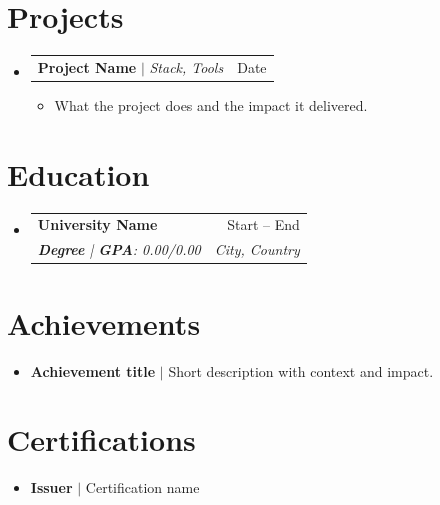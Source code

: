 \documentclass[letterpaper,11pt]{article}
\makeatletter
\newcommand{\resumeItem}[1]{
  \item\small{
    {#1 \vspace{-2pt}}
  }
}
\newcommand{\resumeSubheading}[4]{
  \vspace{-2pt}\item
  \begin{tabular*}{0.97\textwidth}[t]{l@{\extracolsep{\fill}}r}
    \textbf{\color{darkblue}#1} & #2 \\
    \textit{\small#3} & \textit{\small #4} \\
  \end{tabular*}\vspace{-7pt}
}
\newcommand{\resumeProjectHeading}[2]{
    \item
    \begin{tabular*}{0.97\textwidth}{l@{\extracolsep{\fill}}r}
      \small\color{darkblue}#1 & #2 \\
    \end{tabular*}\vspace{-7pt}
}
\newcommand{\resumeSubHeadingListStart}{\begin{itemize}[leftmargin=0.15in, label={}]}
\newcommand{\resumeSubHeadingListEnd}{\end{itemize}}
\newcommand{\resumeItemListStart}{\begin{itemize}}
\newcommand{\resumeItemListEnd}{\end{itemize}\vspace{-5pt}}
\makeatother
\begin{document}
\section{Projects}
  \resumeSubHeadingListStart
    \resumeProjectHeading
      {\textbf{\color{darkblue}Project Name} $|$ \emph{Stack, Tools}}
      {Date}
      \resumeItemListStart
        \resumeItem{What the project does and the impact it delivered.}
      \resumeItemListEnd
  \resumeSubHeadingListEnd

\section{Education}
  \resumeSubHeadingListStart
    \resumeSubheading
      {University Name}{Start -- End}
      {\textbf{Degree} | \textbf{\color{darkblue}GPA}: 0.00/0.00}{City, Country}
  \resumeSubHeadingListEnd

\section{Achievements}
  \resumeSubHeadingListStart
      \resumeItem{\textbf{\color{darkblue}Achievement title} $|$ Short description with context and impact.}
  \resumeSubHeadingListEnd

\section{Certifications}
  \resumeSubHeadingListStart
      \resumeItem{\textbf{\color{darkblue}Issuer} $|$ Certification name}
  \resumeSubHeadingListEnd
\end{document}
